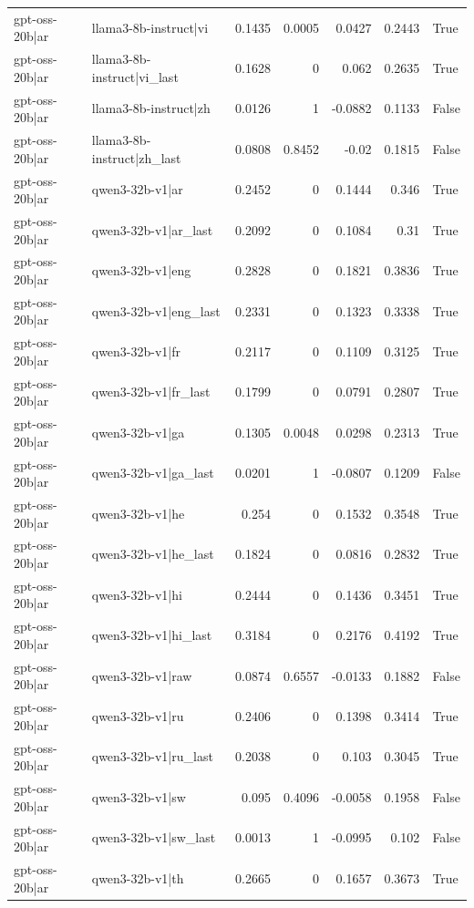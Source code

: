 \begin{table}
\begin{tabular}{l l r r r r l}
gpt-oss-20b|ar & llama3-8b-instruct|vi & 0.1435 & 0.0005 & 0.0427 & 0.2443 & True \\
gpt-oss-20b|ar & llama3-8b-instruct|vi_last & 0.1628 & 0 & 0.062 & 0.2635 & True \\
gpt-oss-20b|ar & llama3-8b-instruct|zh & 0.0126 & 1 & -0.0882 & 0.1133 & False \\
gpt-oss-20b|ar & llama3-8b-instruct|zh_last & 0.0808 & 0.8452 & -0.02 & 0.1815 & False \\
gpt-oss-20b|ar & qwen3-32b-v1|ar & 0.2452 & 0 & 0.1444 & 0.346 & True \\
gpt-oss-20b|ar & qwen3-32b-v1|ar_last & 0.2092 & 0 & 0.1084 & 0.31 & True \\
gpt-oss-20b|ar & qwen3-32b-v1|eng & 0.2828 & 0 & 0.1821 & 0.3836 & True \\
gpt-oss-20b|ar & qwen3-32b-v1|eng_last & 0.2331 & 0 & 0.1323 & 0.3338 & True \\
gpt-oss-20b|ar & qwen3-32b-v1|fr & 0.2117 & 0 & 0.1109 & 0.3125 & True \\
gpt-oss-20b|ar & qwen3-32b-v1|fr_last & 0.1799 & 0 & 0.0791 & 0.2807 & True \\
gpt-oss-20b|ar & qwen3-32b-v1|ga & 0.1305 & 0.0048 & 0.0298 & 0.2313 & True \\
gpt-oss-20b|ar & qwen3-32b-v1|ga_last & 0.0201 & 1 & -0.0807 & 0.1209 & False \\
gpt-oss-20b|ar & qwen3-32b-v1|he & 0.254 & 0 & 0.1532 & 0.3548 & True \\
gpt-oss-20b|ar & qwen3-32b-v1|he_last & 0.1824 & 0 & 0.0816 & 0.2832 & True \\
gpt-oss-20b|ar & qwen3-32b-v1|hi & 0.2444 & 0 & 0.1436 & 0.3451 & True \\
gpt-oss-20b|ar & qwen3-32b-v1|hi_last & 0.3184 & 0 & 0.2176 & 0.4192 & True \\
gpt-oss-20b|ar & qwen3-32b-v1|raw & 0.0874 & 0.6557 & -0.0133 & 0.1882 & False \\
gpt-oss-20b|ar & qwen3-32b-v1|ru & 0.2406 & 0 & 0.1398 & 0.3414 & True \\
gpt-oss-20b|ar & qwen3-32b-v1|ru_last & 0.2038 & 0 & 0.103 & 0.3045 & True \\
gpt-oss-20b|ar & qwen3-32b-v1|sw & 0.095 & 0.4096 & -0.0058 & 0.1958 & False \\
gpt-oss-20b|ar & qwen3-32b-v1|sw_last & 0.0013 & 1 & -0.0995 & 0.102 & False \\
gpt-oss-20b|ar & qwen3-32b-v1|th & 0.2665 & 0 & 0.1657 & 0.3673 & True \\

\end{tabular}
\end{table}
